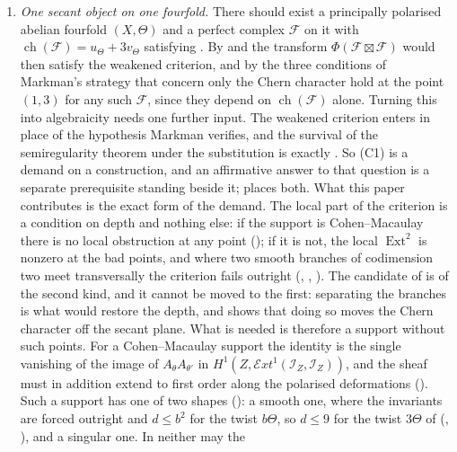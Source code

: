 \documentclass[11pt,reqno]{amsart}
\theoremstyle{plain}
\theoremstyle{definition}
\theoremstyle{remark}
\newcommand{\cF}{\mathcal{F}}
\newcommand{\cE}{\mathcal{E}}
\newcommand{\cI}{\mathcal{I}}
\DeclareMathOperator{\ch}{ch}
\DeclareMathOperator{\Ext}{Ext}
\begin{document}
\begin{enumerate}[label=\textup{(C\arabic*)},leftmargin=3.0em,itemsep=4pt]
\item \emph{One secant object on one fourfold.} There should exist a
  principally polarised abelian fourfold $(X,\Theta)$ and a perfect complex
  $\cF$ on it with $\ch(\cF)=u_{\Theta}+3v_{\Theta}$ satisfying
  \cite[(19)]{paperII}. By \cite[Theorem~4.56]{paperII} and \cite[Corollary~4.57]{paperII}
  the transform $\Phi(\cF\boxtimes\cF)$ would then satisfy the weakened
  criterion, and by \cite[Proposition~4.52]{paperII} the three conditions of Markman's
  strategy that concern only the Chern character hold at the point $(1,3)$
  for any such $\cF$, since they depend on $\ch(\cF)$ alone. Turning this
  into algebraicity needs one further input. The weakened criterion enters
  in place of the hypothesis Markman verifies, and the survival of the
  semiregularity theorem under the substitution is exactly
  \cite[Question 11.4]{Mar25b}. So (C1) is a demand on a construction, and an affirmative answer to
  that question is a separate prerequisite standing beside it;
   places both. What this paper contributes is the exact
  form of the demand. The local part of the criterion is a condition on depth
  and nothing else: if the support is Cohen--Macaulay there is no local
  obstruction at any point (\cite[Theorem~4.75]{paperII}); if it is not, the local
  $\Ext^{2}$ is nonzero at the bad points, and where two smooth branches of
  codimension two meet transversally the criterion fails outright
  (\cite[Theorem~4.61]{paperII}, \cite[Corollary~4.63]{paperII},
  \cite[Corollary~4.77]{paperII}). The candidate of
  \cite[Section 12]{Mar25b} is of the second kind, and it cannot be moved to
  the first: separating the branches is what would restore the depth, and
  \cite[Remark~4.78]{paperII} shows that doing so moves the Chern character
  off the secant plane. What is needed is therefore a support without such
  points. For a Cohen--Macaulay support the identity \cite[(19)]{paperII}
  is the single vanishing of the image of $A_{\theta}A_{\theta'}$ in
  $H^{1}(Z,\cE xt^{1}(\cI_{Z},\cI_{Z}))$, and the sheaf must in addition
  extend to first order along the polarised deformations
  (\cite[Theorem~4.56(iii)]{paperII}). Such a support has one of two
  shapes (\cite[Corollary~4.94]{paperII}): a smooth one, where the invariants are forced
  outright and $d\le b^{2}$ for the twist $b\Theta$, so $d\le9$ for the twist
  $3\Theta$ of \cite[Setup~4.51]{paperII} (\cite[Theorem~4.67]{paperII},
  \cite[Corollary~4.68]{paperII}), and a singular one. In neither may the

\end{enumerate}
\end{document}
